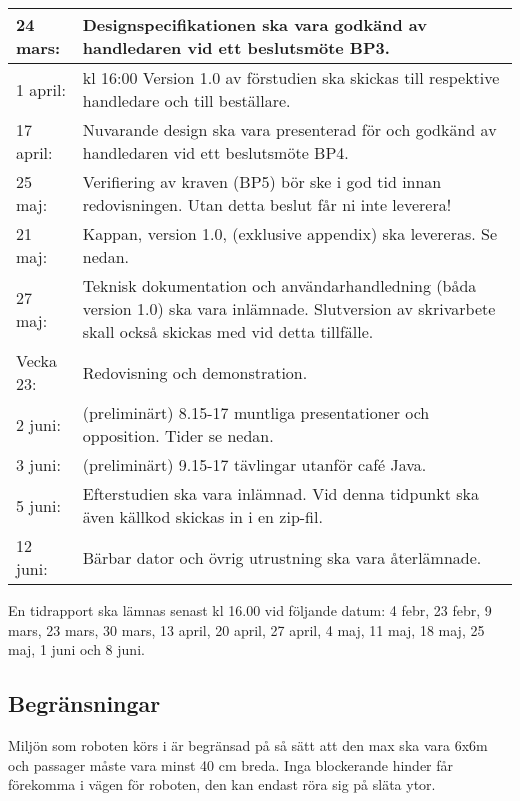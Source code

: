 \documentclass[11pt]{article}
\begin{document}
\begin{flushleft}
\begin{center}
\begin{longtable}{|l |p{.8\linewidth}|}
24 mars: &
Designspecifikationen ska vara godkänd av handledaren vid ett beslutsmöte BP3. \\ \hline

1 april: &
kl 16:00 Version 1.0 av förstudien ska skickas till respektive handledare och till beställare. \\ \hline

17 april: & 
Nuvarande design ska vara presenterad för och godkänd av handledaren vid ett beslutsmöte BP4. \\ \hline

25 maj: &
Verifiering av kraven (BP5) bör ske i god tid innan redovisningen. Utan detta beslut får ni inte leverera! \\ \hline

21 maj: &
Kappan, version 1.0, (exklusive appendix) ska levereras. Se nedan. \\ \hline

27 maj: &
Teknisk dokumentation och användarhandledning (båda version 1.0) ska vara inlämnade. Slutversion av skrivarbete skall också skickas med vid detta tillfälle. \\ \hline

Vecka 23: &
Redovisning och demonstration.\\ \hline

2 juni: &
(preliminärt) 8.15-17 muntliga presentationer och opposition. Tider se nedan. \\ \hline

3 juni: &
(preliminärt) 9.15-17 tävlingar utanför café Java. \\ \hline

5 juni: &
Efterstudien ska vara inlämnad. Vid denna tidpunkt ska även källkod skickas in i en zip-fil. \\ \hline

12 juni: &
Bärbar dator och övrig utrustning ska vara återlämnade. \\ \hline
\end{longtable}
\end{center}

En tidrapport ska lämnas senast kl 16.00 vid följande datum: 4 febr, 23 febr, 9 mars, 23 mars, 30 mars, 13 april, 20 april, 27 april, 4 maj, 11 maj, 18 maj, 25 maj, 1 juni och 8 juni.

\subsection{Begränsningar} %
Miljön som roboten körs i är begränsad på så sätt att den max ska vara 6x6m och passager måste vara minst 40 cm breda. Inga blockerande hinder får förekomma i vägen för roboten, den kan endast röra sig på släta ytor.



\end{flushleft}
\end{document}
